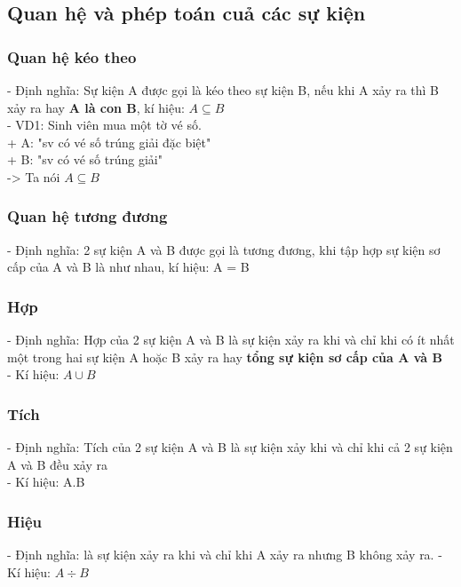 \documentclass{article}
\begin{document}
\subsection{Quan hệ và phép toán cuả các sự kiện}
\subsubsection {Quan hệ kéo theo}
- Định nghĩa: Sự kiện A được gọi là kéo theo sự kiện B, nếu khi A xảy ra thì B xảy ra hay \textbf{A là con B}, kí hiệu: $A \subseteq B$ \\
- VD1: Sinh viên mua một tờ vé số. \\
    + A: "sv có vé số trúng giải đặc biệt" \\
    + B: "sv có vé số trúng giải" \\
    -> Ta nói $A \subseteq B$ \\
\subsubsection {Quan hệ tương đương}
- Định nghĩa: 2 sự kiện A và B được gọi là tương đương, khi tập hợp sự kiện sơ cấp của A và B là như nhau, kí hiệu: A = B\\

\subsubsection[short]{Hợp}
- Định nghĩa: Hợp của 2 sự kiện A và B là sự kiện xảy ra khi và chỉ khi có ít nhất một trong hai sự kiện A hoặc B xảy ra hay \textbf{tổng sự kiện sơ cấp của A và B}\\
- Kí hiệu: $A \cup B$\\

\subsubsection[short]{Tích}
- Định nghĩa: Tích của 2 sự kiện A và B là sự kiện xảy khi và chỉ khi cả 2 sự kiện A và B đều xảy ra\\
- Kí hiệu: A.B

\subsubsection{Hiệu}
- Định nghĩa: là sự kiện xảy ra khi và chỉ khi A xảy ra nhưng B không xảy ra.
- Kí hiệu: $A \div B$
\end{document}
